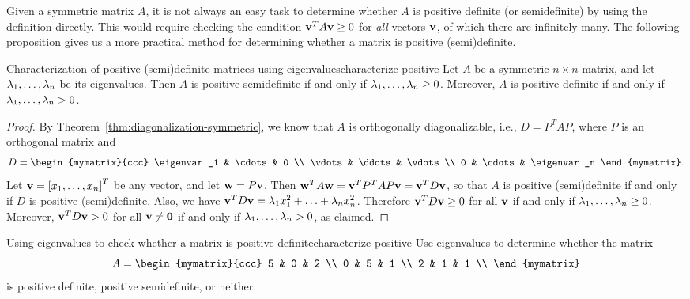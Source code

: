 Given a symmetric matrix $A$, it is not always an easy task to
determine whether $A$ is positive definite (or semidefinite) by using
the definition directly. This would require checking the condition
$\vect{v}^TA\vect{v}\geq 0$ for {\em all} vectors $\vect{v}$, of which
there are infinitely many. The following proposition gives us a more
practical method for determining whether a matrix is positive
(semi)definite.

\begin{proposition}{Characterization of positive (semi)definite matrices using eigenvalues}{characterize-positive}
  Let $A$ be a symmetric $n\times n$-matrix, and let
  $\lambda_1,\ldots,\lambda_n$ be its eigenvalues. Then $A$ is
  positive semidefinite if and only if
  $\lambda_1,\ldots,\lambda_n\geq 0$. Moreover, $A$ is positive
  definite if and only if $\lambda_1,\ldots,\lambda_n>0$.
\end{proposition}

\begin{proof}
  By Theorem~\ref{thm:diagonalization-symmetric}, we know that $A$ is
  orthogonally diagonalizable, i.e., $D=P^TAP$, where $P$ is an
  orthogonal matrix and
  \begin{equation*}
    D = \begin{mymatrix}{ccc}
      \eigenvar_1 & \cdots & 0 \\
      \vdots & \ddots & \vdots \\
      0 & \cdots & \eigenvar_n
    \end{mymatrix}.
  \end{equation*}
  Let $\vect{v}=\mat{x_1,\ldots,x_n}^T$ be any vector, and let
  $\vect{w}=P\vect{v}$. Then
  $\vect{w}^TA\vect{w} = \vect{v}^TP^TAP\vect{v} =
  \vect{v}^TD\vect{v}$, so that $A$ is positive (semi)definite if and
  only if $D$ is positive (semi)definite. Also, we have
  $\vect{v}^TD\vect{v} = \eigenvar_1x_1^2 + \ldots +
  \eigenvar_nx_n^2$. Therefore $\vect{v}^TD\vect{v}\geq 0$ for all
  $\vect{v}$ if and only if $\lambda_1,\ldots,\lambda_n\geq
  0$. Moreover, $\vect{v}^TD\vect{v}>0$ for all
  $\vect{v}\neq \vect{0}$ if and only if
  $\lambda_1,\ldots,\lambda_n>0$, as claimed.
\end{proof}

\begin{example}{Using eigenvalues to check whether a matrix is positive definite}{characterize-positive}
  Use eigenvalues to determine whether the matrix
  \begin{equation*}
    A = \begin{mymatrix}{ccc}
      5 & 0 & 2 \\
      0 & 5 & 1 \\
      2 & 1 & 1 \\
    \end{mymatrix}
  \end{equation*}
  is positive definite, positive semidefinite, or neither.
\end{example}

